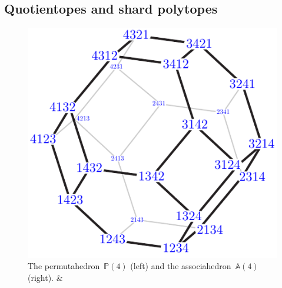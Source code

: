 \documentclass{amsart}
\theoremstyle{definition}
\newcommand{\polytope}[1]{\mathds{#1}} %
\newcommand{\Perm}{\polytope{P}} %
\newcommand{\Asso}{\polytope{A}} %
\begin{document}

\subsection{Quotientopes and shard polytopes}
\label{subsec:quotientopes}

\begin{figure}
	\capstart
	\centerline{\includegraphics[scale=.6]{permutahedronLeft4} \qquad {}}
	\caption{The permutahedron~$\Perm(4)$ (left) and the associahedron~$\Asso(4)$ (right). \cite[Fig.~1]{MR3964495} \&~\cite[Fig.~5]{MR4584712}}
	\label{fig:quotientopes}
\end{figure}
\end{document}
